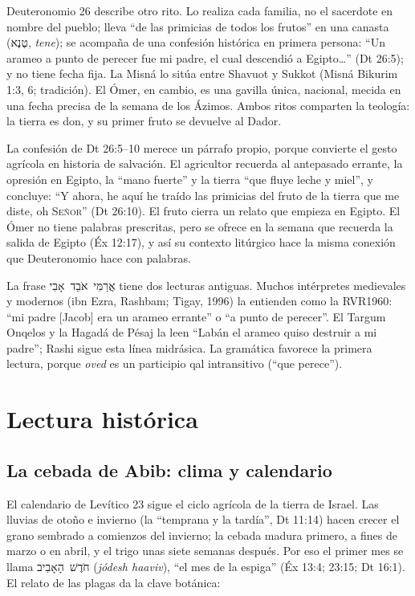\documentclass[11pt,letterpaper]{article}
\newcommand{\heb}[1]{\mbox{\foreignlanguage{hebrew}{#1}}}
\newcommand{\SENOR}{\textsc{Señor}}
\begin{document}
\begin{nota}
Deuteronomio 26 describe otro rito. Lo realiza cada familia, no el sacerdote en nombre del pueblo; lleva ``de las primicias de todos los frutos'' en una canasta (\heb{טֶנֶא}, \emph{tene}); se acompaña de una confesión histórica en primera persona: ``Un arameo a punto de perecer fue mi padre, el cual descendió a Egipto\ldots'' (Dt 26:5); y no tiene fecha fija. La Misná lo sitúa entre Shavuot y Sukkot (Misná Bikurim 1:3, 6; tradición). El Ómer, en cambio, es una gavilla única, nacional, mecida en una fecha precisa de la semana de los Ázimos. Ambos ritos comparten la teología: la tierra es don, y su primer fruto se devuelve al Dador.
\end{nota}

La confesión de Dt 26:5--10 merece un párrafo propio, porque convierte el gesto agrícola en historia de salvación. El agricultor recuerda al antepasado errante, la opresión en Egipto, la ``mano fuerte'' y la tierra ``que fluye leche y miel'', y concluye: ``Y ahora, he aquí he traído las primicias del fruto de la tierra que me diste, oh \SENOR'' (Dt 26:10). El fruto cierra un relato que empieza en Egipto. El Ómer no tiene palabras prescritas, pero se ofrece en la semana que recuerda la salida de Egipto (Éx 12:17), y así su contexto litúrgico hace la misma conexión que Deuteronomio hace con palabras.

\begin{nota}
La frase \heb{אֲרַמִּי אֹבֵד אָבִי} tiene dos lecturas antiguas. Muchos intérpretes medievales y modernos (ibn Ezra, Rashbam; Tigay, 1996) la entienden como la RVR1960: ``mi padre [Jacob] era un arameo errante'' o ``a punto de perecer''. El Targum Onqelos y la Hagadá de Pésaj la leen ``Labán el arameo quiso destruir a mi padre''; Rashi sigue esta línea midrásica. La gramática favorece la primera lectura, porque \emph{oved} es un participio qal intransitivo (``que perece'').
\end{nota}

\section{Lectura histórica}

\subsection{La cebada de Abib: clima y calendario}
El calendario de Levítico 23 sigue el ciclo agrícola de la tierra de Israel. Las lluvias de otoño e invierno (la ``temprana y la tardía'', Dt 11:14) hacen crecer el grano sembrado a comienzos del invierno; la cebada madura primero, a fines de marzo o en abril, y el trigo unas siete semanas después. Por eso el primer mes se llama \heb{חֹדֶשׁ הָאָבִיב} (\emph{jódesh haaviv}), ``el mes de la espiga'' (Éx 13:4; 23:15; Dt 16:1). El relato de las plagas da la clave botánica:
\end{document}

